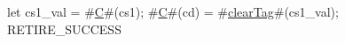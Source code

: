 let cs1_val = #\hyperref[sailRISCVzC]{C}#(cs1);
#\hyperref[sailRISCVzC]{C}#(cd) = #\hyperref[sailRISCVzclearTag]{clearTag}#(cs1_val);
RETIRE_SUCCESS
